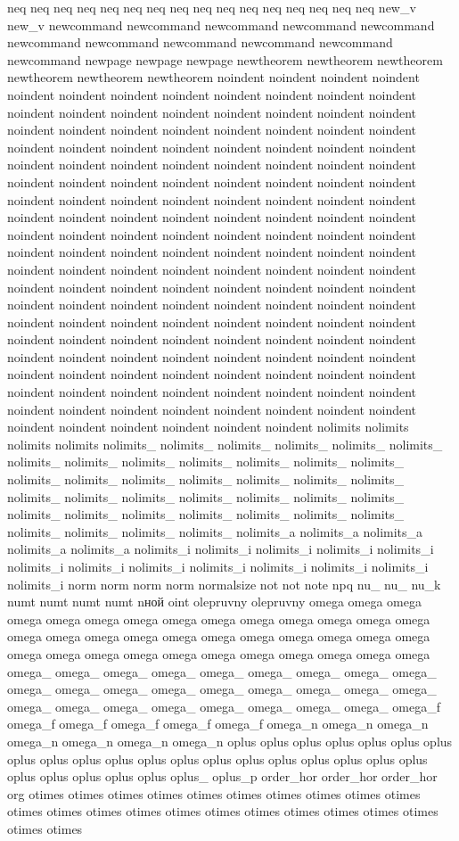 neq neq neq neq neq neq neq neq neq neq neq neq neq neq neq neq new_v new_v newcommand newcommand newcommand newcommand newcommand newcommand newcommand newcommand newcommand newcommand newcommand newpage newpage newpage newtheorem newtheorem newtheorem newtheorem newtheorem newtheorem noindent noindent noindent noindent noindent noindent noindent noindent noindent noindent noindent noindent noindent noindent noindent noindent noindent noindent noindent noindent noindent noindent noindent noindent noindent noindent noindent noindent noindent noindent noindent noindent noindent noindent noindent noindent noindent noindent noindent noindent noindent noindent noindent noindent noindent noindent noindent noindent noindent noindent noindent noindent noindent noindent noindent noindent noindent noindent noindent noindent noindent noindent noindent noindent noindent noindent noindent noindent noindent noindent noindent noindent noindent noindent noindent noindent noindent noindent noindent noindent noindent noindent noindent noindent noindent noindent noindent noindent noindent noindent noindent noindent noindent noindent noindent noindent noindent noindent noindent noindent noindent noindent noindent noindent noindent noindent noindent noindent noindent noindent noindent noindent noindent noindent noindent noindent noindent noindent noindent noindent noindent noindent noindent noindent noindent noindent noindent noindent noindent noindent noindent noindent noindent noindent noindent noindent noindent noindent noindent noindent noindent noindent noindent noindent noindent noindent noindent noindent noindent noindent noindent noindent noindent noindent noindent noindent noindent noindent noindent noindent noindent noindent nolimits nolimits nolimits nolimits nolimits_ nolimits_ nolimits_ nolimits_ nolimits_ nolimits_ nolimits_ nolimits_ nolimits_ nolimits_ nolimits_ nolimits_ nolimits_ nolimits_ nolimits_ nolimits_ nolimits_ nolimits_ nolimits_ nolimits_ nolimits_ nolimits_ nolimits_ nolimits_ nolimits_ nolimits_ nolimits_ nolimits_ nolimits_ nolimits_ nolimits_ nolimits_ nolimits_ nolimits_ nolimits_ nolimits_ nolimits_ nolimits_ nolimits_a nolimits_a nolimits_a nolimits_a nolimits_a nolimits_i nolimits_i nolimits_i nolimits_i nolimits_i nolimits_i nolimits_i nolimits_i nolimits_i nolimits_i nolimits_i nolimits_i nolimits_i norm norm norm norm normalsize not not note npq nu_ nu_ nu_k numt numt numt numt nной oint olepruvny olepruvny omega omega omega omega omega omega omega omega omega omega omega omega omega omega omega omega omega omega omega omega omega omega omega omega omega omega omega omega omega omega omega omega omega omega omega omega omega_ omega_ omega_ omega_ omega_ omega_ omega_ omega_ omega_ omega_ omega_ omega_ omega_ omega_ omega_ omega_ omega_ omega_ omega_ omega_ omega_ omega_ omega_ omega_ omega_ omega_ omega_f omega_f omega_f omega_f omega_f omega_f omega_n omega_n omega_n omega_n omega_n omega_n omega_n oplus oplus oplus oplus oplus oplus oplus oplus oplus oplus oplus oplus oplus oplus oplus oplus oplus oplus oplus oplus oplus oplus oplus oplus oplus oplus_ oplus_p order_hor order_hor order_hor org otimes otimes otimes otimes otimes otimes otimes otimes otimes otimes otimes otimes otimes otimes otimes otimes otimes otimes otimes otimes otimes otimes otimes 